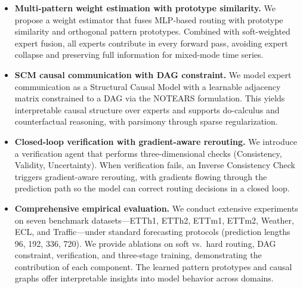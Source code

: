 \begin{itemize}[leftmargin=*]
    \item \textbf{Multi-pattern weight estimation with prototype similarity.} We propose a weight estimator that fuses MLP-based routing with prototype similarity and orthogonal pattern prototypes. Combined with soft-weighted expert fusion, all experts contribute in every forward pass, avoiding expert collapse and preserving full information for mixed-mode time series.

    \item \textbf{SCM causal communication with DAG constraint.} We model expert communication as a Structural Causal Model with a learnable adjacency matrix constrained to a DAG via the NOTEARS formulation. This yields interpretable causal structure over experts and supports do-calculus and counterfactual reasoning, with parsimony through sparse regularization.

    \item \textbf{Closed-loop verification with gradient-aware rerouting.} We introduce a verification agent that performs three-dimensional checks (Consistency, Validity, Uncertainty). When verification fails, an Inverse Consistency Check triggers gradient-aware rerouting, with gradients flowing through the prediction path so the model can correct routing decisions in a closed loop.

    \item \textbf{Comprehensive empirical evaluation.} We conduct extensive experiments on seven benchmark datasets---ETTh1, ETTh2, ETTm1, ETTm2, Weather, ECL, and Traffic---under standard forecasting protocols (prediction lengths 96, 192, 336, 720). We provide ablations on soft vs.\ hard routing, DAG constraint, verification, and three-stage training, demonstrating the contribution of each component. The learned pattern prototypes and causal graphs offer interpretable insights into model behavior across domains.
\end{itemize}

